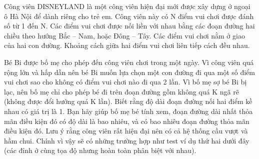 Công viên DISNEYLAND là một công viên hiện đại mới được xây dựng ở ngoại ô Hà Nội để dành riêng cho trẻ em. Công viên này có N điểm vui chơi được đánh số từ 1 đến N. Các điểm vui chơi được nối liền với nhau bằng các đoạn đường hai chiều theo hướng Bắc – Nam, hoặc Đông – Tây. Các điểm vui chơi nằm ở giao của hai con đường. Khoảng cách giữa hai điểm vui chơi liên tiếp cách đều nhau.  

   Bé Bi được bố mẹ cho phép đến công viên chơi trong một ngày. Vì công viên quá rộng lớn và hấp dẫn nên bé Bi muốn lựa chọn một con đường đi qua một số điểm vui chơi sao cho không có điểm vui chơi nào đi qua 2 lần. Vì bố mẹ sợ bé Bi bị lạc, nên bố mẹ chỉ cho phép bé đi trên đoạn đường gồm không quá K ngã rẽ (không được đổi hướng quá K lần). Biết rằng độ dài đoạn đường nối hai điểm kề nhau có giá trị là 1. Bạn hãy giúp bố mẹ bé tính xem, đoạn đường dài nhất thỏa mãn điều kiện đó có độ dài là bao nhiêu, và có bao nhiêu đoạn đường thỏa mãn điều kiện đó. Lưu ý rằng công viên rất hiện đại nên có cả hệ thống cầu vượt và hầm chui. Chính vì vậy sẽ có những trường hợp như test ví dụ thứ hai dưới đây (các đỉnh ở cùng tọa độ nhưng hoàn toàn phân biệt với nhau).
